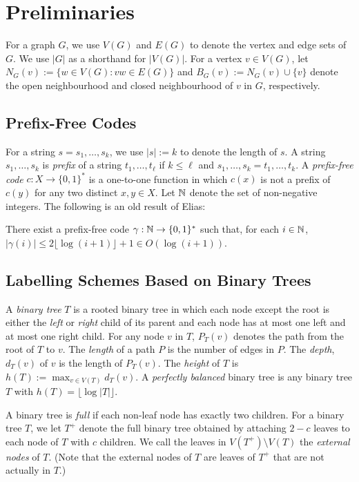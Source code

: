 \documentclass[kpfonts]{patmorin}
\begin{document}
\section{Preliminaries}

For a graph $G$, we use $V(G)$ and $E(G)$ to denote the vertex and edge sets of $G$.  We use $|G|$ as a shorthand for $|V(G)|$. For a vertex $v\in V(G)$, let $N_G(v):=\{w\in V(G): vw\in E(G)\}$ and $B_G(v):=N_G(v)\cup\{v\}$ denote the open neighbourhood and closed neighbourhood of $v$ in $G$, respectively.

\subsection{Prefix-Free Codes}

For a string $s=s_1,\ldots,s_k$, we use $|s|:=k$ to denote the length of $s$. A string $s_1,\ldots,s_k$ is \emph{prefix} of a string $t_1,\ldots,t_\ell$ if $k\le \ell$ and $s_1,\ldots,s_k=t_1,\ldots,t_k$.  A \emph{prefix-free code} $c:X\to\{0,1\}^*$ is a one-to-one function in which $c(x)$ is not a prefix of $c(y)$ for any two distinct $x,y\in X$.  Let $\mathbb{N}$ denote the set of non-negative integers.  The following is an old result of Elias:

\begin{lem}
    There exist a prefix-free code $\gamma:\mathbb{N}\to\{0,1\}^*$ such that, for each $i\in\mathbb{N}$, $|\gamma(i)|\le 2\lfloor\log(i+1)\rfloor + 1\in O(\log(i+1))$.
\end{lem}

\subsection{Labelling Schemes Based on Binary Trees}

A \emph{binary tree} $T$ is a rooted binary tree in which each node except the root is either the \emph{left} or \emph{right} child of its parent and each node has at most one left and at most one right child.  For any node $v$ in $T$, $P_T(v)$ denotes the path from the root of $T$ to $v$.  The \emph{length} of a path $P$ is the number of edges in $P$.  The \emph{depth}, $d_T(v)$ of $v$ is the length of $P_T(v)$.  The \emph{height} of $T$ is $h(T):=\max_{v\in V(T)} d_T(v)$.  A \emph{perfectly balanced} binary tree is any binary tree $T$ with $h(T)=\lfloor\log|T|\rfloor$.

A binary tree is \emph{full} if each non-leaf node has exactly two children. For a binary tree $T$, we let $T^+$ denote the full binary tree obtained by attaching $2-c$ leaves to each node of $T$ with $c$ children.  We call the leaves in $V(T^+)\setminus V(T)$ the \emph{external nodes} of $T$.  (Note that the external nodes of $T$ are leaves of $T^+$ that are not actually in $T$.)
\end{document}
